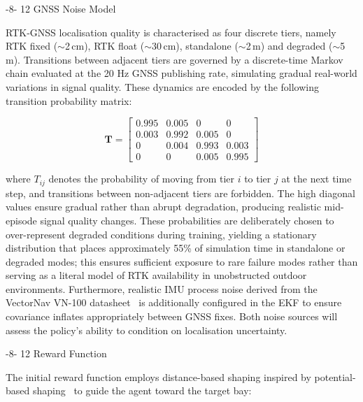 \documentclass{sig-alternate}
\makeatletter
\renewcommand\subsection{\@startsection{subsection}{2}{\z@}%
    {-8\p@ \@plus -2\p@ \@minus -\p@}%
    {12\p@}%
    {\secfnt}}
\makeatother
\begin{document}
\subsection{GNSS Noise Model}

RTK-GNSS localisation quality is characterised as four discrete tiers, namely RTK fixed ($\sim$2\,cm), RTK float ($\sim$30\,cm), standalone ($\sim$2\,m) and degraded ($\sim$5\,m). Transitions between adjacent tiers are governed by a discrete-time Markov chain evaluated at the 20 Hz GNSS publishing rate, simulating gradual real-world variations in signal quality. These dynamics are encoded by the following transition probability matrix:

\begin{equation}
    \mathbf{T} = \begin{bmatrix}
        0.995 & 0.005 & 0     & 0     \\
        0.003 & 0.992 & 0.005 & 0     \\
        0     & 0.004 & 0.993 & 0.003 \\
        0     & 0     & 0.005 & 0.995
    \end{bmatrix}
    \label{eq:markov}
\end{equation}

\noindent where $T_{ij}$ denotes the probability of moving from tier $i$ to tier $j$ at the next time step, and transitions between non-adjacent tiers are forbidden. The high diagonal values ensure gradual rather than abrupt degradation, producing realistic mid-episode signal quality changes. These probabilities are deliberately chosen to over-represent degraded conditions during training, yielding a stationary distribution that places approximately 55\% of simulation time in standalone or degraded modes; this ensures sufficient exposure to rare failure modes rather than serving as a literal model of RTK availability in unobstructed outdoor environments. Furthermore, realistic IMU process noise derived from the VectorNav VN-100 datasheet~\cite{vectornav2023vn100} is additionally configured in the EKF to ensure covariance inflates appropriately between GNSS fixes. Both noise sources will assess the policy's ability to condition on localisation uncertainty.

\subsection{Reward Function}

The initial reward function employs distance-based shaping inspired by potential-based shaping~\cite{ng1999reward} to guide the agent toward the target bay:
\end{document}
